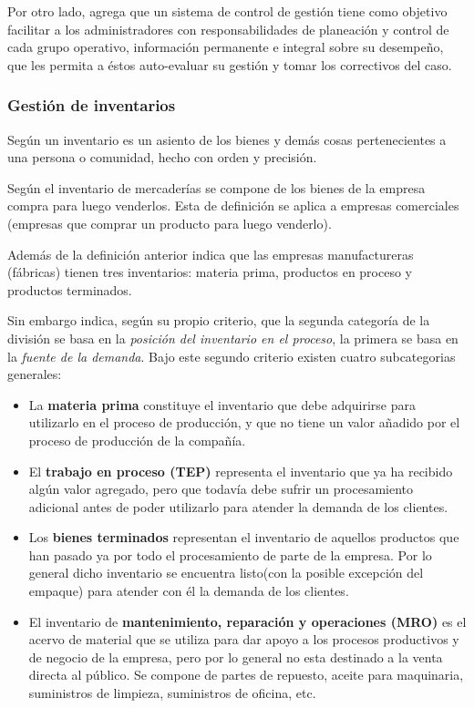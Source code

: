 Por otro lado, \cite{beltran} agrega que un sistema de control de gestión tiene
como objetivo facilitar a los administradores con responsabilidades de planeación
y control de cada grupo operativo, información permanente e integral sobre su desempeño,
que les permita a éstos auto-evaluar su gestión y tomar los correctivos del caso.



\subsubsection{Gestión de inventarios}
Según \cite{rae} un inventario es un asiento de los bienes y demás cosas
pertenecientes a una persona o comunidad, hecho con orden y precisión.

Según \cite{meza} el inventario de mercaderías se compone de los bienes de la
empresa compra para luego venderlos. Esta de definición se aplica a empresas
comerciales (empresas que comprar un producto para luego venderlo).

Además de la definición anterior \cite{meza} indica que las empresas manufactureras
(fábricas) tienen tres inventarios: materia prima, productos en proceso y productos
terminados.

Sin embargo \cite{chapman} indica, según su propio criterio, que la segunda categoría de la división se basa
en la \emph{posición del inventario en el proceso}, la primera se basa en la
\emph{fuente de la demanda}. Bajo este segundo criterio existen cuatro subcategorias
generales:
\begin{itemize}
  \item La \textbf{materia prima} constituye el inventario que debe adquirirse para
        utilizarlo en el proceso de producción, y que no tiene un valor añadido
        por el proceso de producción de la compañía.
  \item El \textbf{trabajo en proceso (TEP)} representa el inventario que ya ha recibido
        algún valor agregado, pero que todavía debe sufrir un procesamiento
        adicional antes de poder utilizarlo para atender la demanda de los clientes.
  \item Los \textbf{bienes terminados} representan el inventario de aquellos productos
        que han pasado ya por todo el procesamiento de parte de la empresa. Por lo general
        dicho inventario se encuentra listo(con la posible excepción del empaque)
        para atender con él la demanda de los clientes.
  \item El inventario de \textbf{mantenimiento, reparación y operaciones (MRO)}
        es el acervo de material que se utiliza para dar apoyo a los procesos productivos
        y de negocio de la empresa, pero por lo general no esta destinado a la venta
        directa al público. Se compone de partes de repuesto, aceite para maquinaria,
        suministros de limpieza, suministros de oficina, etc.
\end{itemize}


